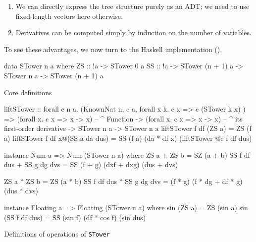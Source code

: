 \documentclass[./rims-smooth-paper.tex]{subfiles}
\begin{document}
\begin{enumerate}
\item We can directly express the tree structure purely as an ADT; we need to use fixed-length vectors here otherwise.
\item Derivatives can be computed simply by induction on the number of variables.
\end{enumerate}

To see these advantages, we now turn to the Haskell implementation ().
\begin{listing}[htbp]
\begin{code}
data STower n a where
  ZS :: !a -> STower 0 a
  SS :: !a -> STower (n + 1) a -> STower n a -> STower (n + 1) a
\end{code}
\caption{Core definitions\label{lst:data-def}}
\end{listing}

\begin{listing}[htbp]
\begin{code}
liftSTower
  :: forall c n a. (KnownNat n, c a, forall x k. c x => c (STower k x) )
  => (forall x. c x => x -> x)
      -- ^ Function
  -> (forall x. c x => x -> x)
      -- ^ its first-order derivative
  -> STower n a
  -> STower n a
liftSTower f df (ZS a) = ZS (f a)
liftSTower f df x@(SS a da dus) = SS (f a) (da * df x) (liftSTower @c f df dus)

instance Num a => Num (STower n a) where
  ZS a + ZS b = SZ (a + b)
  SS f df dus + SS g dg dvs = SS (f + g) (dxf + dxg) (dus + dvs)

  ZS a * ZS b = ZS (a * b)
  SS f df dus * SS g dg dvs = (f * g) (f * dg + df * g) (dus * dvs)

instance Floating a => Floating (STower n a) where
  sin (ZS a) = ZS (sin a)
  sin (SS f df dus) = SS (sin f) (df * cos f) (sin dus)
\end{code}
\caption{Definitions of operations of \texttt{STower}\label{lst:ops-def}}
\end{listing}
\end{document}
